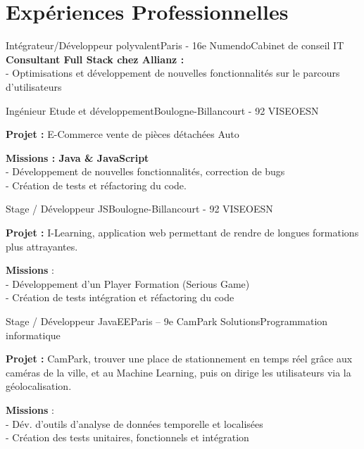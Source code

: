 \section{Expériences Professionnelles}
	\begin{minipage}{\textwidth}
		
		{Intégrateur/Développeur polyvalent}{Paris - 16e}
		{Numendo}{Cabinet de conseil IT}
		{\textbf{Consultant Full Stack chez Allianz :} \\- Optimisations et développement de nouvelles fonctionnalités sur le parcours d'utilisateurs}
		
		{Ingénieur Etude et développement}{Boulogne-Billancourt - 92}
		{VISEO}{ESN}
		{\textbf{Projet :} E-Commerce vente de pièces détachées Auto
			
		\textbf{Missions : Java \& JavaScript}
		\\- Développement de nouvelles fonctionnalités, correction de bugs
		\\- Création de tests et réfactoring du code.
		}
			{Stage / Développeur JS}{Boulogne-Billancourt - 92}
			{VISEO}{ESN}
			{\textbf{Projet :} I-Learning, application web permettant de rendre  de longues formations plus attrayantes.
				
			\textbf{Missions} :
			\\- Développement d'un Player Formation (Serious Game)
			\\- Création de tests intégration et réfactoring du code
			}
		
		\smallskip{}
		{Stage / Développeur JavaEE}{Paris – 9e}
		{CamPark Solutions}{Programmation informatique}
		{\textbf{Projet :} CamPark, trouver une place de stationnement en temps réel grâce aux caméras de la ville, et au Machine Learning, puis on dirige les utilisateurs via la géolocalisation.
			
			\textbf{Missions} : 
			\\- Dév. d’outils d’analyse de données temporelle et localisées
			\\- Création des tests unitaires, fonctionnels et intégration
		}


\end{minipage}
